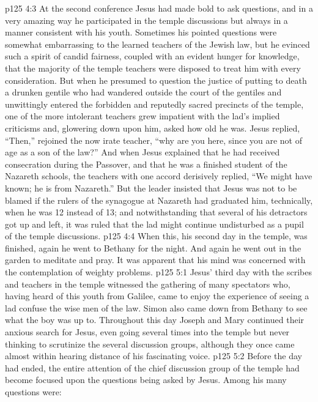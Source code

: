\vs p125 4:3 At the second conference Jesus had made bold to ask questions, and in a very amazing way he participated in the temple discussions but always in a manner consistent with his youth. Sometimes his pointed questions were somewhat embarrassing to the learned teachers of the Jewish law, but he evinced such a spirit of candid fairness, coupled with an evident hunger for knowledge, that the majority of the temple teachers were disposed to treat him with every consideration. But when he presumed to question the justice of putting to death a drunken gentile who had wandered outside the court of the gentiles and unwittingly entered the forbidden and reputedly sacred precincts of the temple, one of the more intolerant teachers grew impatient with the lad’s implied criticisms and, glowering down upon him, asked how old he was. Jesus replied,  “Then,” rejoined the now irate teacher, “why are you here, since you are not of age as a son of the law?” And when Jesus explained that he had received consecration during the Passover, and that he was a finished student of the Nazareth schools, the teachers with one accord derisively replied, “We might have known; he is from Nazareth.” But the leader insisted that Jesus was not to be blamed if the rulers of the synagogue at Nazareth had graduated him, technically, when he was 12 instead of 13; and notwithstanding that several of his detractors got up and left, it was ruled that the lad might continue undisturbed as a pupil of the temple discussions.
\vs p125 4:4 When this, his second day in the temple, was finished, again he went to Bethany for the night. And again he went out in the garden to meditate and pray. It was apparent that his mind was concerned with the contemplation of weighty problems.
\vs p125 5:1 Jesus’ third day with the scribes and teachers in the temple witnessed the gathering of many spectators who, having heard of this youth from Galilee, came to enjoy the experience of seeing a lad confuse the wise men of the law. Simon also came down from Bethany to see what the boy was up to. Throughout this day Joseph and Mary continued their anxious search for Jesus, even going several times into the temple but never thinking to scrutinize the several discussion groups, although they once came almost within hearing distance of his fascinating voice.
\vs p125 5:2 Before the day had ended, the entire attention of the chief discussion group of the temple had become focused upon the questions being asked by Jesus. Among his many questions were:

